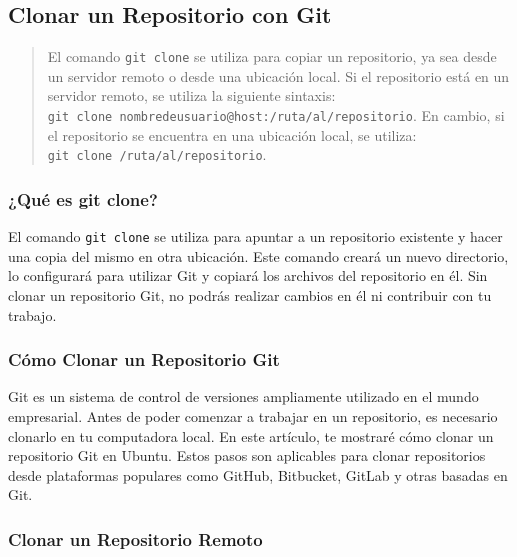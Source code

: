 \documentclass[
  letterpaper,
  DIV=11,
  numbers=noendperiod]{scrartcl}
\begin{document}
\hypertarget{clonar-un-repositorio-con-git}{%
\subsection{Clonar un Repositorio con
Git}\label{clonar-un-repositorio-con-git}}

\begin{quote}
El comando \texttt{git\ clone} se utiliza para copiar un repositorio, ya
sea desde un servidor remoto o desde una ubicación local. Si el
repositorio está en un servidor remoto, se utiliza la siguiente
sintaxis:
\texttt{git\ clone\ nombredeusuario@host:/ruta/al/repositorio}. En
cambio, si el repositorio se encuentra en una ubicación local, se
utiliza: \texttt{git\ clone\ /ruta/al/repositorio}.
\end{quote}

\hypertarget{quuxe9-es-git-clone}{%
\subsubsection{¿Qué es git clone?}\label{quuxe9-es-git-clone}}

El comando \texttt{git\ clone} se utiliza para apuntar a un repositorio
existente y hacer una copia del mismo en otra ubicación. Este comando
creará un nuevo directorio, lo configurará para utilizar Git y copiará
los archivos del repositorio en él. Sin clonar un repositorio Git, no
podrás realizar cambios en él ni contribuir con tu trabajo.

\hypertarget{cuxf3mo-clonar-un-repositorio-git}{%
\subsubsection{Cómo Clonar un Repositorio
Git}\label{cuxf3mo-clonar-un-repositorio-git}}

Git es un sistema de control de versiones ampliamente utilizado en el
mundo empresarial. Antes de poder comenzar a trabajar en un repositorio,
es necesario clonarlo en tu computadora local. En este artículo, te
mostraré cómo clonar un repositorio Git en Ubuntu. Estos pasos son
aplicables para clonar repositorios desde plataformas populares como
GitHub, Bitbucket, GitLab y otras basadas en Git.

\hypertarget{clonar-un-repositorio-remoto}{%
\subsubsection{Clonar un Repositorio
Remoto}\label{clonar-un-repositorio-remoto}}
\end{document}
